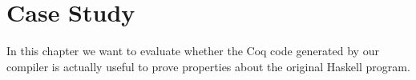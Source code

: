 \chapter{Case Study} \label{chp:case-study}
In this chapter we want to evaluate whether the Coq code generated by our compiler is actually useful to prove properties about the original Haskell program.
